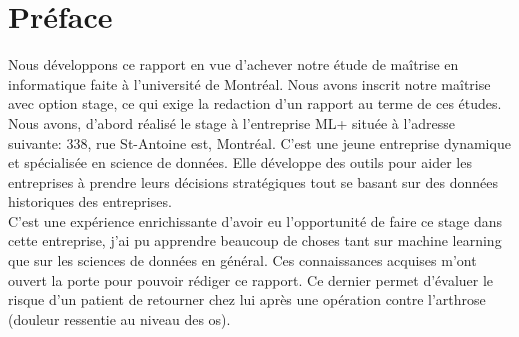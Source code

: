 \documentclass[12pt, french]{report}
\begin{document}
\newpage

\chapter*{Préface}
Nous développons ce rapport en vue d'achever notre étude de maîtrise en informatique faite à l'université de Montréal. Nous avons inscrit notre maîtrise avec option stage, ce qui exige la redaction d'un rapport au terme de ces études. Nous avons, d'abord réalisé le stage à l'entreprise ML+ située à l'adresse suivante: 338, rue St-Antoine est, Montréal. C'est une jeune entreprise dynamique et spécialisée en science de données. Elle développe des outils pour aider les entreprises à prendre leurs décisions stratégiques tout se basant sur des données historiques des entreprises. \\

C'est une expérience enrichissante d'avoir eu l'opportunité de faire ce stage dans cette entreprise, j'ai pu apprendre beaucoup de choses tant sur machine learning que sur les sciences de données en général. Ces connaissances acquises m'ont ouvert  la porte pour pouvoir rédiger ce rapport. Ce dernier permet d'évaluer le risque d'un patient de retourner chez lui après une opération contre l'arthrose (douleur ressentie au niveau des os).  

\newpage

\listoffigures

\newpage

\listoftables

\newpage

\end{document}
